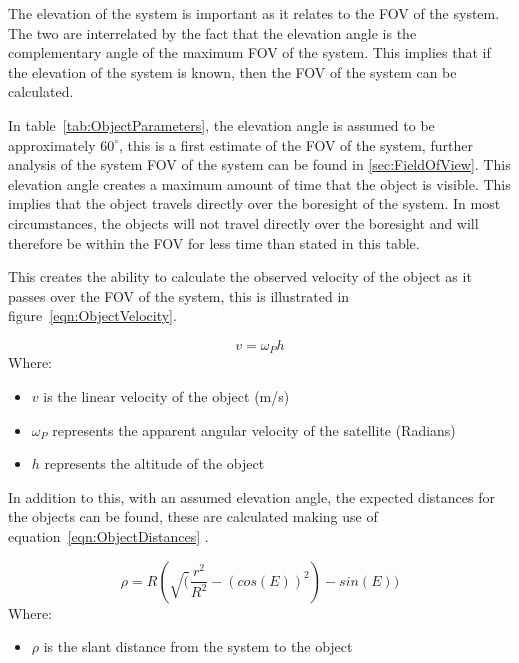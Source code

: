 \documentclass[11pt]{witseiepaper}
\begin{document}
The elevation of the system is important as it relates to the FOV of the system. The two are interrelated by the fact that the elevation angle is the complementary angle of the maximum FOV of the system. This implies that if the elevation of the system is known, then the FOV of the system can be calculated.

In table~\ref{tab:ObjectParameters}, the elevation angle is assumed to be approximately $60^{\circ}$, this is a first estimate of the FOV of the system, further analysis of the system FOV of the system can be found in \ref{sec:FieldOfView}. This elevation angle creates a maximum amount of time that the object is visible. This implies that the object travels directly over the boresight of the system. In most circumstances, the objects will not travel directly over the boresight and will therefore be within the FOV for less time than stated in this table.

This creates the ability to calculate the observed velocity of the object as it passes over the FOV of the system, this is illustrated in figure~\ref{eqn:ObjectVelocity}.

\begin{equation} \label{eqn:ObjectVelocity}
    v = \omega_{P} h
\end{equation}
Where:
\begin{itemize}
    \item $v$ is the linear velocity of the object (m/s)
    \item $\omega_{P}$ represents the apparent angular velocity of the satellite (Radians)
    \item $h$ represents the altitude of the object
\end{itemize}


In addition to this, with an assumed elevation angle, the expected distances for the objects can be found, these are calculated making use of equation~\ref{eqn:ObjectDistances} \cite{ObservableTime}.


\begin{equation} \label{eqn:ObjectVelocity}
    \rho = R (\sqrt(\frac{r^2}{R^2} - (cos(E))^2) - sin(E))
    \end{equation}
Where:
\begin{itemize}
    \item $\rho$ is the slant distance from the system to the object
\end{itemize}
\end{document}
